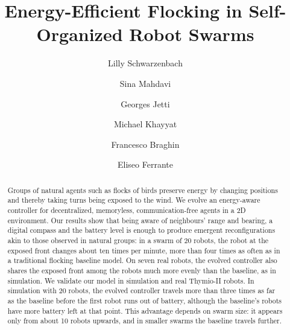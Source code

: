 \documentclass[runningheads]{llncs}
\begin{document}
%

\title{Energy-Efficient Flocking in Self-Organized Robot Swarms}
%

%
\author{
Lilly Schwarzenbach \and
Sina Mahdavi \and
Georges Jetti \and
Michael Khayyat \and
Francesco Braghin \and
Eliseo Ferrante}

%
%

%
\maketitle              %
%
\begin{abstract} %

Groups of natural agents such as flocks of birds preserve energy by changing positions and thereby taking turns being exposed to the wind. We evolve an energy-aware controller for decentralized, memoryless, communication-free agents in a 2D environment. Our results show that being aware of neighbours' range and bearing, a digital compass and the battery level is enough to produce emergent reconfigurations akin to those observed in natural groups: in a swarm of 20 robots, the robot at the exposed front changes about ten times per minute, more than four times as often as in a traditional flocking baseline model.  On seven real robots, the evolved controller also shares the exposed front among the robots much more evenly than the baseline, as in simulation.
We validate our model in simulation and real Thymio-II robots. In simulation with 20 robots, the evolved controller travels more than three times as far as the baseline before the first robot runs out of battery, although the baseline's robots have more battery left at that point. This advantage depends on swarm size: it appears only from about 10 robots upwards, and in smaller swarms the baseline travels further.

\end{abstract}
%
%
%
\end{document}

